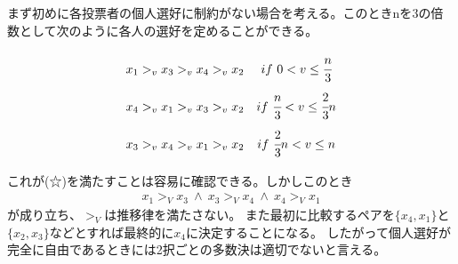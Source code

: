 \documentclass[10pt,uplatex]{jsarticle}
\theoremstyle{case}
\begin{document}
    まず初めに各投票者の個人選好に制約がない場合を考える。このときnを$3$の倍数として次のように各人の選好を定めることができる。
    \begin{eqnarray*}
        \renewcommand{\arraystretch}{2.5}
        \begin{array}{cc}
            x_1>_v x_3>_v x_4>_v x_2 & if\ 0<v\le\cfrac{n}{3}\\
            x_4>_v x_1>_v x_3>_v x_2 & if\ \cfrac{n}{3}<v\le\cfrac{2}{3}{n}\\
            x_3>_v x_4>_v x_1>_v x_2 & if\ \cfrac{2}{3}n<v\le n
        \end{array}
    \end{eqnarray*}

    これが(☆)を満たすことは容易に確認できる。しかしこのとき
    \begin{eqnarray*}
        x_1>_V x_3\ \land\ x_3>_V x_4\ \land\ x_4>_V x_1
    \end{eqnarray*}
    が成り立ち、$>_V$は推移律を満たさない。
    また最初に比較するペアを$\{x_4,x_1\}$と$\{x_2,x_3\}$などとすれば最終的に$x_4$に決定することになる。
    したがって個人選好が完全に自由であるときには2択ごとの多数決は適切でないと言える。\\
\end{document}
